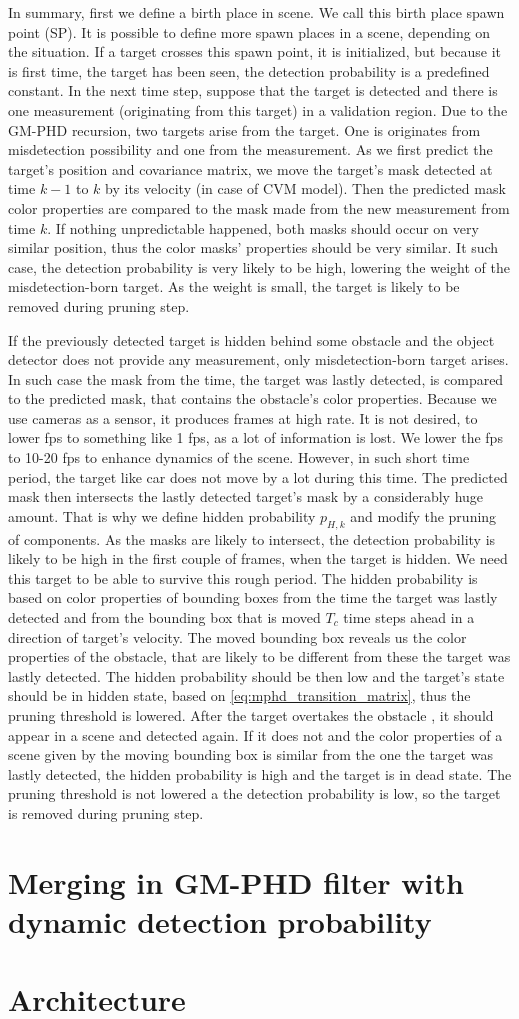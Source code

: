 In summary, first we define a birth place in scene. We call this birth place spawn point (SP). It is possible to
define more spawn places in a scene, depending on the situation. If a target crosses this spawn point, it is initialized, but because it is first time, the target has been seen, the detection probability is a predefined constant. In the
next time step, suppose that the target is detected and there is one measurement (originating from this target) in a
validation region. Due to the GM-PHD recursion, two targets arise from the target. One is originates from
misdetection possibility and one from the measurement. As we first predict the target's position and covariance
matrix, we move the target's mask detected at time $k-1$ to $k$ by its velocity (in case of CVM model). Then the
predicted mask color properties are compared to the mask made from the new measurement from time $k$. If nothing
unpredictable happened, both masks should occur on very similar position, thus the color masks' properties should be
very similar. It such case, the detection probability is very likely to be high, lowering the weight of the
misdetection-born target. As the weight is small, the target is likely to be removed during pruning step.

If the previously detected target is hidden behind some obstacle and the object detector does not provide any
measurement, only misdetection-born target arises. In such case the mask from the time, the target was lastly
detected, is compared to the predicted mask, that contains the obstacle's color properties. Because we use cameras as
a sensor, it produces frames at high rate. It is not desired, to lower fps to something like 1 fps, as a lot of
information is lost. We lower the fps to 10-20 fps to enhance dynamics of the scene. However, in such short time
period, the target like car does not move by a lot during this time. The predicted mask then intersects the lastly
detected target's mask by a considerably huge amount. That is why we define hidden probability $p_{H,k}$ and modify
the pruning of components. As the masks are likely to intersect, the detection probability is likely to be high in
the first couple of frames, when the target is hidden. We need this target to be able to survive this rough period.
The hidden probability is based on color properties of bounding boxes from the time the target was lastly detected
and from the bounding box that is moved $T_c$ time steps ahead in a direction of target's velocity. The moved
bounding box reveals us the color properties of the obstacle, that are likely to be different from these the target
was lastly detected. The hidden probability should be then low and the target's state should be in hidden state,
based on \ref{eq:mphd_transition_matrix}, thus the pruning threshold is lowered. After the target overtakes the obstacle
, it should appear in a scene and detected again. If it does not and the color properties of a scene given by the
moving
bounding box is similar from the one the target was lastly detected, the hidden probability is high and the target is
in dead state. The pruning threshold is not lowered a the detection probability is low, so the target is removed
during pruning step.
\section{Merging in GM-PHD filter with dynamic detection probability}
\section{Architecture}